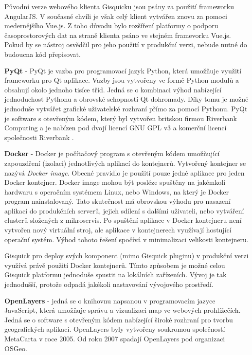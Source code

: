 Původní verze webového klienta Gisquicku jsou psány za použití
frameworku AngularJS. V současné chvíli je však celý klient vytvářen
znovu za pomoci medernějšího Vue.js. Z toho důvodu bylo rozšíření
platformy o podporu časoprostorových dat na straně klienta psáno ve
stejném framevorku Vue.js. Pokud by se nástroj osvědčil pro jeho
použití v produkční verzi, nebude nutné do budoucna kód přepisovat.

\newpage
\bigskip
\noindent
\textbf{PyQt} - PyQt je vazba pro programovací jazyk Python, která umožňuje využití
frameworku pro Qt aplikace. Vazby jsou vytvořeny ve formě Python
modulů a obsahují okolo jednoho tisíce tříd. Jedná se o kombinaci
výhod nabízející jednoduchost Pythonu a obrovské schopnosti Qt
dohromady. Díky tomu je možné jednoduše vytvářet grafické uživatelské
rozhraní přímo za pomocí Pythonu. PyQt je software s otevřeným kódem,
který byl vytvořen britskou firmou Riverbank Computing a je nabízen
pod dvojí licencí GNU GPL v3 a komerční licencí společnosti
Riverbank \cite{pyqt}.

\bigskip
\noindent
\textbf{Docker} - Docker je počítačový program s otevřeným kódem umožňující zapouzdření
(izolaci) jednotlivých aplikací do kontejnerů. Vytvořený kontejner se
nazývá \textit{Docker image}. Obecné pravidlo je použití pouze jedné
aplikace pro jeden Docker kontejner. Docker image mohou být posléze
spuštěny na jakémkoli hardwaru s operačním systémem Linux, nebo
Windows, na který je Docker program nainstalovaný. Tato skutečnost má
obrovskou výhodu pro nasazení aplikací do produkčních serverů, jejich
sdílení s dalšími uživateli, nebo vytváření clusterů složených z
mikroservis. Po spuštění aplikace v Docker kontejneru není vytvořen
nový virtuální stroj, ale aplikace v kontejnerech využívají hostující
operační systém. Výhod tohoto řešení spočívá v minimalizaci velikosti
kontejneru.

Gisquick pro deploy svých komponent (mimo Gisquick pluginu) v
produkční verzi využívá právě použití Docker kontejnerů. Tímto
způsobem je možné celou Gisquick platformu jednoduše spustit na
lokálních zařízeních. Vývoj je tak jednodušší, protože odpadá jakékoli
nastavování vývojového prostředí.

\bigskip
\noindent
\textbf{OpenLayers} - jedná se o knihovnu napsanou v programovacím jazyce JavaScript, která umožňuje správu a vizualizaci map ve webových prohlížečích. Jedná se o software s otevřeným kódem nabízející široké rozhraní pro tvorbu geografických aplikací. OpenLayers byly vytvořeny soukromou společností MetaCarta v roce 2005. Od roku 2007 spadají OpenLayers pod organizaci OSGeo.

